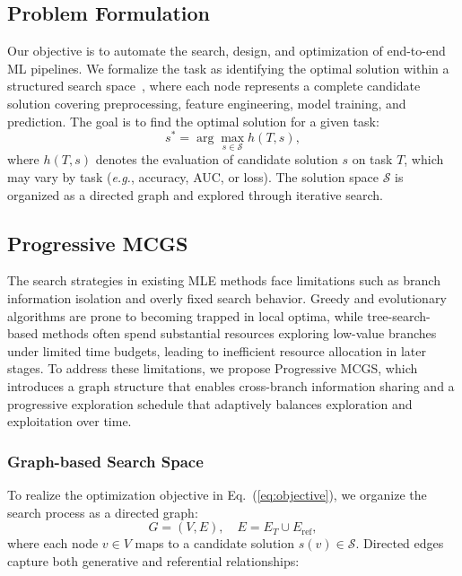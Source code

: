 \subsection{Problem Formulation}

Our objective is to automate the search, design, and optimization of end-to-end ML pipelines. We formalize the task as identifying the optimal solution within a structured search space~\citep{aide}, where each node represents a complete candidate solution covering preprocessing, feature engineering, model training, and prediction.
The goal is to find the optimal solution for a given task:
\begin{equation}
\label{eq:objective}
s^{*} = \arg\max_{s \in \mathcal{S}} h(T, s),
\end{equation}
where $h(T,s)$ denotes the evaluation of candidate solution $s$ on task $T$, which may vary by task (\textit{e.g.}, accuracy, AUC, or loss). The solution space $\mathcal{S}$ is organized as a directed graph and explored through iterative search.




\subsection{Progressive MCGS}
\label{sec:pmcgs}

The search strategies in existing MLE methods face limitations such as branch information isolation and overly fixed search behavior. Greedy and evolutionary algorithms are prone to becoming trapped in local optima, while tree-search-based methods often spend substantial resources exploring low-value branches under limited time budgets, leading to inefficient resource allocation in later stages.
To address these limitations, we propose Progressive MCGS, which introduces a graph structure that enables cross-branch information sharing and a progressive exploration schedule that adaptively balances exploration and exploitation over time.


\subsubsection{Graph-based Search Space}
\label{sec:graph}

To realize the optimization objective in Eq.~(\ref{eq:objective}), we organize the search process as a directed graph:
\begin{equation}
\label{eq:graph}
G = (V, E), \quad E = E_{T} \cup E_{\text{ref}},
\end{equation}
where each node $v \in V$ maps to a candidate solution $s(v) \in \mathcal{S}$. Directed edges capture both generative and referential relationships:

